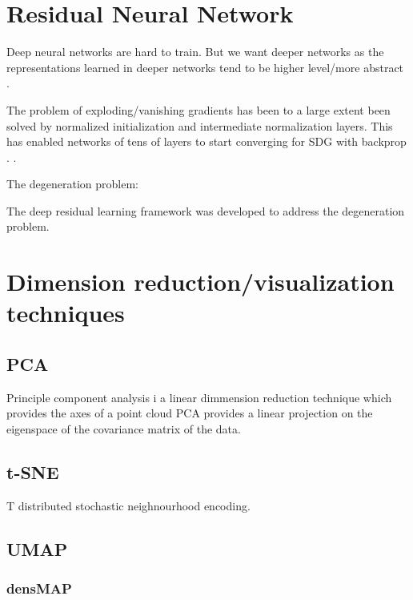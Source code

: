 \documentclass[../../thesis.tex]{subfiles}
\begin{document}
\section{Residual Neural Network}

Deep neural networks are hard to train. But we want deeper networks as the representations learned in deeper networks tend to be higher level/more abstract \cite{zeiler2013visualizing}. 

The problem of exploding/vanishing gradients  has been to a large extent been solved by normalized initialization and intermediate normalization layers. This has enabled networks of tens of layers to start converging for SDG with backprop \cite{he2015deep}. .



The degeneration problem: 

The deep residual learning framework was developed to address the degeneration problem.

\cite{he2015deep}

\section{Dimension reduction/visualization techniques}

\subsection{PCA}
Principle component analysis i a linear dimmension reduction technique which provides the axes of a point cloud 
 PCA provides a linear projection on the eigenspace of the covariance matrix of the data. 



\subsection{t-SNE}
\cite{t-SNE}
T distributed stochastic neighnourhood encoding.

\subsection{UMAP}
\cite{mcinnes2020umap}

\subsubsection{densMAP}
\end{document}
